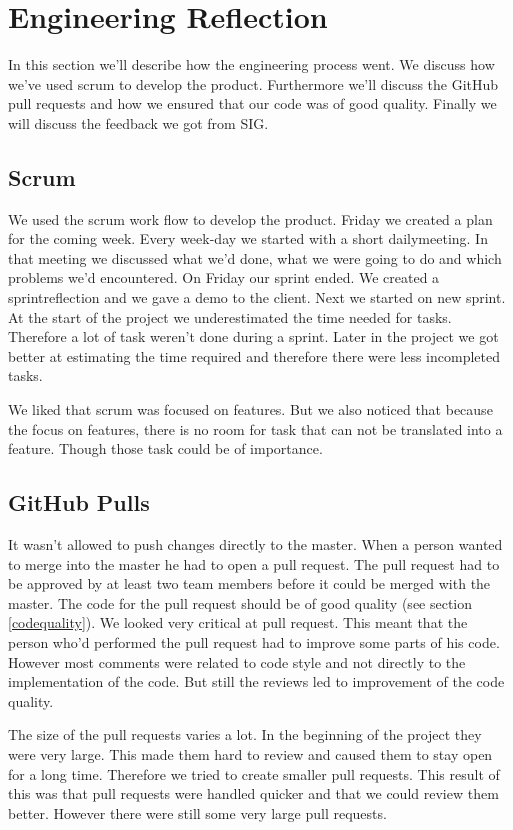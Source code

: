 \chapter{Engineering Reflection} %

In this section we'll describe how the engineering process went. We discuss how we've used scrum to develop the product. Furthermore we'll discuss the GitHub pull requests and how we ensured that our code was of good quality. Finally we will discuss the feedback we got from SIG.

\section{Scrum}
We used the scrum work flow to develop the product. Friday we created a plan for the coming week. Every week-day we started with a short dailymeeting. In that meeting we discussed what we'd done, what we were going to do and which problems we'd encountered. On Friday our sprint ended. We created a sprintreflection and we gave a demo to the client. Next we started on new sprint. 
At the start of the project we underestimated the time needed for tasks. Therefore a lot of task weren't done during a sprint. Later in the project we got better at estimating the time required and therefore there were less incompleted tasks.

We liked that scrum was focused on features. But we also noticed that because the focus on features, there is no room for task that can not be translated into a feature. Though those task could be of importance.

\section{GitHub Pulls}
It wasn't allowed to push changes directly to the master. When a person wanted to merge into the master he had to open a pull request. The pull request had to be approved by at least two team members before it could be merged with the master. The code for the pull request should be of good quality (see section \ref{codequality}).  We looked very critical at pull request. This meant that the person who'd performed the pull request had to improve some parts of his code. However most comments were related to code style and not directly to the implementation of the code. But still the reviews led to improvement of the code quality. 

The size of the pull requests varies a lot. In the beginning of the project they were very large. This made them hard to review and caused them to stay open for a long time. Therefore we tried to create smaller pull requests. This result of this was that pull requests were handled quicker and that we could review them better. However there were still some very large pull requests.

